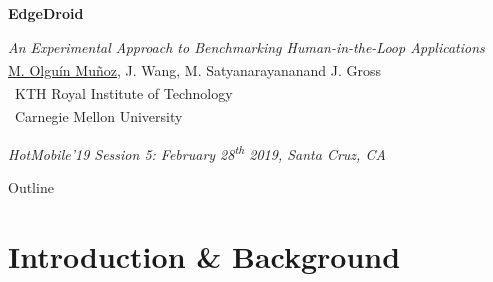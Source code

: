 \documentclass[aspectratio=1610]{beamer}
\newcommand{\kthaffil}{\textsuperscript{\textdagger}}
\newcommand{\cmuaffil}{\textsuperscript{\textdaggerdbl}}
\begin{document}
\startpage
\begin{frame}{}
    \begin{center}
        \begin{LARGE}
            \textbf{EdgeDroid}\\
        \end{LARGE}
        \emph{An Experimental Approach to Benchmarking Human-in-the-Loop Applications}\\
        \vspace{0.02\textheight}
        {\footnotesize \underline{M. Olguín Muñoz}\kthaffil, J. Wang\cmuaffil, M. Satyanarayanan\cmuaffil and J. Gross\kthaffil\\
            \vspace{0.02\textheight}
            \kthaffil~KTH Royal Institute of Technology\\
            \cmuaffil~Carnegie Mellon University\\}
    \end{center}

    \vspace{0.04\textheight}

    \begin{tiny}
        \raggedleft%
        \emph{HotMobile'19 Session 5: February 28\textsuperscript{th} 2019, Santa Cruz, CA}\\
    \end{tiny}
\end{frame}

\normalpage
\begin{frame}{Outline}
    \tableofcontents[hideallsubsections]
\end{frame}

\section{Introduction \& Background}
\end{document}
